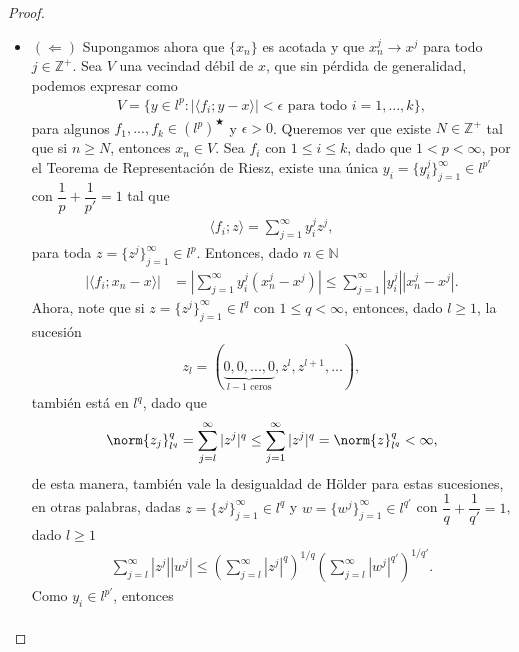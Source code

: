 \begin{proof}
\begin{enumerate}
\begin{itemize}
            \item $(\Longleftarrow)$ Supongamos ahora que $\{x_n\}$ es acotada y que $x_n^j\to x^j$ para todo $j\in \mathbb{Z}^+$. Sea $V$ una vecindad débil de $x$, que sin pérdida de generalidad, podemos expresar como
            \begin{align*}
                V=\{y \in l^p:|\langle f_i;y-x\rangle|<\epsilon \text{ para todo } i=1,...,k\},
            \end{align*}
            para algunos $f_1,...,f_k \in (l^p)^\bigstar$ y $\epsilon>0$. Queremos ver que existe $N\in \mathbb{Z}^+$ tal que si $n\geq N$, entonces $x_n\in V$. Sea $f_i$ con $1\leq i\leq k$, dado que $1<p<\infty$, por el Teorema de Representación de Riesz, existe una única $y_i=\{y_i^j\}_{j=1}^\infty\in l^{p'}$ con $\dfrac{1}{p}+\dfrac{1}{p'}=1$ tal que 
            \begin{align*}
                \langle f_i;z\rangle=\sum_{j=1}^\infty y_i^jz^j,
            \end{align*}
            para toda $z=\{z^j\}_{j=1}^\infty\in l^p$. Entonces, dado $n \in \mathbb{N}$
            \begin{align*}
                |\langle f_i;x_n-x\rangle|&=\left|\sum_{j=1}^\infty y_i^j(x_n^j-x^j)\right|\leq \sum_{j=1}^\infty |y_i^j||x_n^j-x^j|.
            \end{align*}
            Ahora, note que si $z=\{z^j\}_{j=1}^\infty\in l^q$ con $1\leq q<\infty$, entonces, dado $l\geq 1$, la sucesión 
            \begin{align*}
                z_l=(\underbrace{0,0,...,0}_{l-1 \text{ ceros}},z^l,z^{l+1},...),
            \end{align*}
            también está en $l^q$, dado que 
            \begin{align*}
                \norm{z_j}_{l^q}^q=\sum_{j=l}^\infty|z^j|^q\leq \sum_{j=1}^\infty |z^j|^q=\norm{z}_{l^q}^q<\infty,
            \end{align*}
            de esta manera, también vale la desigualdad de Hölder para estas sucesiones, en otras palabras, dadas $z=\{z^{j}\}_{j=1}^\infty\in l^q$ y $w=\{w^j\}_{j=1}^\infty \in l^{q'}$ con $\dfrac{1}{q}+\dfrac{1}{q'}=1$, dado $l\geq 1$
            \begin{align*}
                \sum_{j=l}^\infty |z^j||w^j|\leq \left(\sum_{j=l}^\infty|z^j|^q\right)^{1/q}\left(\sum_{j=l}^\infty |w^j|^{q'}\right)^{1/q'}.
            \end{align*}
            Como $y_i \in l^{p'}$, entonces
            \begin{align*}

\end{align*}
\end{itemize}
\end{enumerate}
\end{proof}

